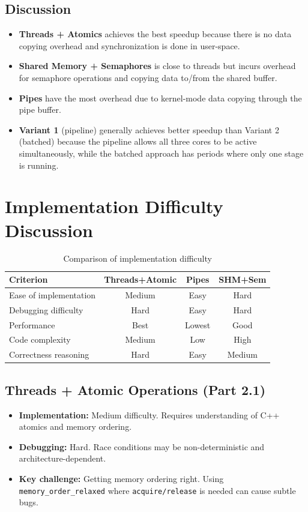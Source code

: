 \documentclass[12pt,a4paper]{article}
\begin{document}
\subsection{Discussion}
\begin{itemize}
    \item \textbf{Threads + Atomics} achieves the best speedup because there is no data copying overhead and synchronization is done in user-space.
    \item \textbf{Shared Memory + Semaphores} is close to threads but incurs overhead for semaphore operations and copying data to/from the shared buffer.
    \item \textbf{Pipes} have the most overhead due to kernel-mode data copying through the pipe buffer.
    \item \textbf{Variant 1} (pipeline) generally achieves better speedup than Variant 2 (batched) because the pipeline allows all three cores to be active simultaneously, while the batched approach has periods where only one stage is running.
\end{itemize}

\section{Implementation Difficulty Discussion}

\begin{table}[H]
\centering
\begin{tabular}{lccc}
\toprule
\textbf{Criterion} & \textbf{Threads+Atomic} & \textbf{Pipes} & \textbf{SHM+Sem} \\
\midrule
Ease of implementation & Medium & Easy & Hard \\
Debugging difficulty & Hard & Easy & Hard \\
Performance & Best & Lowest & Good \\
Code complexity & Medium & Low & High \\
Correctness reasoning & Hard & Easy & Medium \\
\bottomrule
\end{tabular}
\caption{Comparison of implementation difficulty}
\end{table}

\subsection{Threads + Atomic Operations (Part 2.1)}
\begin{itemize}
    \item \textbf{Implementation:} Medium difficulty. Requires understanding of C++ atomics and memory ordering.
    \item \textbf{Debugging:} Hard. Race conditions may be non-deterministic and architecture-dependent.
    \item \textbf{Key challenge:} Getting memory ordering right. Using \texttt{memory\_order\_relaxed} where \texttt{acquire/release} is needed can cause subtle bugs.
\end{itemize}
\end{document}
